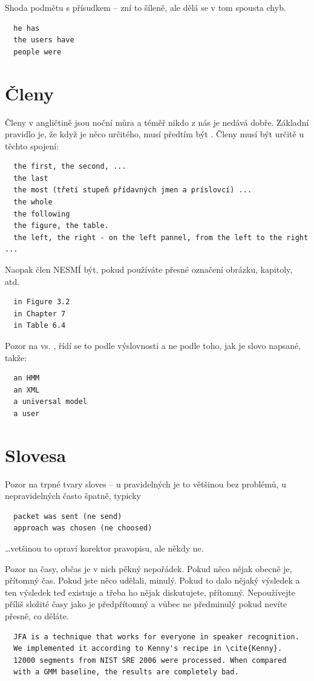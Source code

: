 \noindent Shoda podmětu s přísudkem -- zní to šíleně, ale dělá se v tom spousta chyb.

\begin{verbatim}
  he has
  the users have
  people were
\end{verbatim}

\section*{Členy}

Členy v angličtině jsou noční můra a téměř nikdo z nás je nedává dobře. Základní pravidlo je, že když je něco určitého, musí předtím být . Členy musí být určitě u těchto spojení:
\begin{verbatim}
  the first, the second, ...
  the last
  the most (třetí stupeň přídavných jmen a príslovcí) ...
  the whole
  the following
  the figure, the table.
  the left, the right - on the left pannel, from the left to the right ...
\end{verbatim}

\noindent Naopak člen NESMÍ být, pokud používáte přesné označení obrázku, kapitoly, atd.
\begin{verbatim}
  in Figure 3.2
  in Chapter 7
  in Table 6.4
\end{verbatim}

\begin{samepage}
\noindent Pozor na  vs. , řídí se to podle výslovnosti a ne podle toho, jak je slovo napsané, takže:
\begin{verbatim}
  an HMM
  an XML
  a universal model
  a user
\end{verbatim}
\end{samepage}

\section*{Slovesa}

Pozor na trpné tvary sloves -- u pravidelných je to většinou bez problémů, u nepravidelných často špatně, typicky
\begin{verbatim}
  packet was sent (ne send)
  approach was chosen (ne choosed)
\end{verbatim}
\noindent \ldots vetšinou to opraví korektor pravopisu, ale někdy ne.

Pozor na časy, občas je v nich pěkný nepořádek. Pokud něco nějak obecně je, přítomný čas. Pokud jste něco udělali, minulý. Pokud to dalo nějaký výsledek a ten výsledek teď existuje a třeba ho nějak diskutujete, přítomný. Nepoužívejte příliš složité časy jako je předpřítomný a vůbec ne předminulý pokud nevíte přesně, co děláte.
\begin{verbatim}
  JFA is a technique that works for everyone in speaker recognition.
  We implemented it according to Kenny's recipe in \cite{Kenny}.
  12000 segments from NIST SRE 2006 were processed. When compared
  with a GMM baseline, the results are completely bad.
\end{verbatim}

